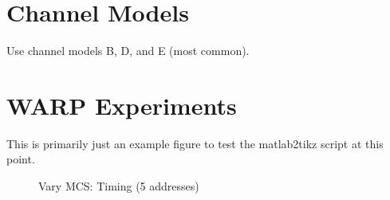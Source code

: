 
\section{Channel Models}

Use channel models B, D, and E (most common).




\section{WARP Experiments}



This is primarily just an example figure to test the matlab2tikz script at this point.\\

\begin{figure}[H]
	\centering
	\setlength\figureheight{5cm}
	\setlength{}
	
	\caption[vary\_mcs-timing-5\_addresses]{Vary MCS: Timing (5 addresses)}
	\label{fig:vary_mcs-timing-5_addresses}
\end{figure}
